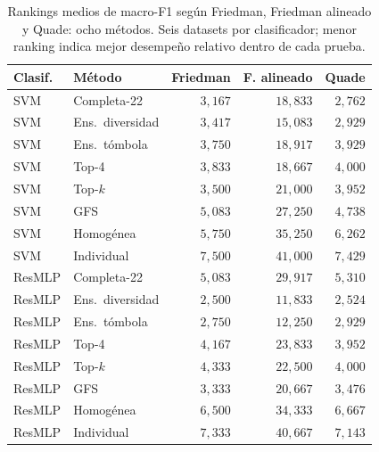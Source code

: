 \documentclass[11pt,a4paper]{article}
\begin{document}
\begin{table}[H]
\centering\fontsize{8}{10}\selectfont\setlength{\tabcolsep}{3.0pt}
\caption{Rankings medios de macro-F1 según Friedman, Friedman alineado y Quade: ocho métodos. Seis datasets por clasificador; menor ranking indica mejor desempeño relativo dentro de cada prueba.}
\label{tab:sel-metodos-rankings}
\begin{tabular}{@{}llrrr@{}}
\toprule
Clasif. & Método & Friedman & F. alineado & Quade \\
\midrule
SVM & Completa-22 & $3{,}167$ & $18{,}833$ & $2{,}762$ \\
SVM & Ens.\ diversidad & $3{,}417$ & $15{,}083$ & $2{,}929$ \\
SVM & Ens.\ tómbola & $3{,}750$ & $18{,}917$ & $3{,}929$ \\
SVM & Top-4 & $3{,}833$ & $18{,}667$ & $4{,}000$ \\
SVM & Top-$k$ & $3{,}500$ & $21{,}000$ & $3{,}952$ \\
SVM & GFS & $5{,}083$ & $27{,}250$ & $4{,}738$ \\
SVM & Homogénea & $5{,}750$ & $35{,}250$ & $6{,}262$ \\
SVM & Individual & $7{,}500$ & $41{,}000$ & $7{,}429$ \\
ResMLP & Completa-22 & $5{,}083$ & $29{,}917$ & $5{,}310$ \\
ResMLP & Ens.\ diversidad & $2{,}500$ & $11{,}833$ & $2{,}524$ \\
ResMLP & Ens.\ tómbola & $2{,}750$ & $12{,}250$ & $2{,}929$ \\
ResMLP & Top-4 & $4{,}167$ & $23{,}833$ & $3{,}952$ \\
ResMLP & Top-$k$ & $4{,}333$ & $22{,}500$ & $4{,}000$ \\
ResMLP & GFS & $3{,}333$ & $20{,}667$ & $3{,}476$ \\
ResMLP & Homogénea & $6{,}500$ & $34{,}333$ & $6{,}667$ \\
ResMLP & Individual & $7{,}333$ & $40{,}667$ & $7{,}143$ \\
\bottomrule
\end{tabular}
\end{table}
\end{document}
